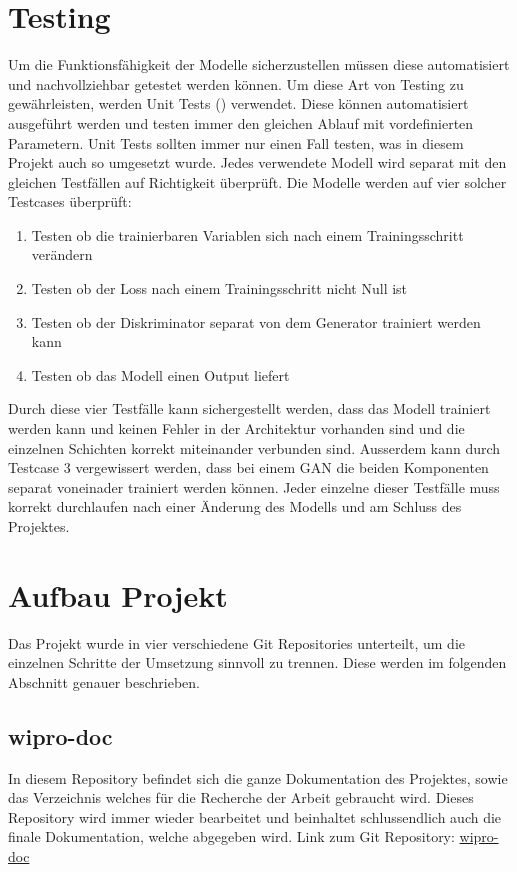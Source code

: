 \section{Testing}
\label{sec:methode_test}
Um die Funktionsfähigkeit der Modelle sicherzustellen müssen diese automatisiert und nachvollziehbar getestet werden
können. Um diese Art von Testing zu gewährleisten, werden Unit Tests (\cite{unit_test}) verwendet. Diese können automatisiert ausgeführt
werden und testen immer den gleichen Ablauf mit vordefinierten Parametern. Unit Tests sollten immer nur einen Fall
testen, was in diesem Projekt auch so umgesetzt wurde.
\newline
\newline
Jedes verwendete Modell wird separat mit den gleichen Testfällen auf Richtigkeit überprüft. Die Modelle werden auf vier
solcher Testcases überprüft:
\begin{enumerate}
	\setlength\itemsep{0em}
	\item Testen ob die trainierbaren Variablen sich nach einem Trainingsschritt verändern
	\item Testen ob der Loss nach einem Trainingsschritt nicht Null ist
	\item Testen ob der Diskriminator separat von dem Generator trainiert werden kann
	\item Testen ob das Modell einen Output liefert
\end{enumerate}
\noindent
Durch diese vier Testfälle kann sichergestellt werden, dass das Modell trainiert werden kann und keinen Fehler in
der Architektur vorhanden sind und die einzelnen Schichten korrekt miteinander verbunden sind. Ausserdem kann durch
Testcase $3$ vergewissert werden, dass bei einem \gls{GAN} die beiden Komponenten separat voneinader trainiert werden
können. Jeder einzelne dieser Testfälle muss korrekt durchlaufen nach einer Änderung des Modells und am Schluss des
Projektes.

\section{Aufbau Projekt}
\label{sec:aufbau_projekt}
Das Projekt wurde in vier verschiedene Git Repositories unterteilt, um die einzelnen Schritte der Umsetzung sinnvoll zu
trennen. Diese werden im folgenden Abschnitt genauer beschrieben.

\subsection{wipro-doc}
\label{sub:wipro-doc}
In diesem Repository befindet sich die ganze Dokumentation des Projektes, sowie das Verzeichnis welches für die
Recherche der Arbeit gebraucht wird. Dieses Repository wird immer wieder bearbeitet und beinhaltet schlussendlich auch
die finale Dokumentation, welche abgegeben wird.
\newline
Link zum Git Repository: \hyperlink{https://gitlab.enterpriselab.ch/Pwn3rs/wipro-doc}{wipro-doc}
\newline
{}

